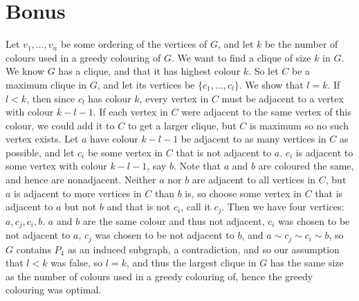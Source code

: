 \documentclass[11pt]{article}
\begin{document}
\section{Bonus} %
Let $v_1,\ldots,v_n$ be some ordering of the vertices of $G$, and let $k$ be
the number of colours used in a greedy colouring of $G$. We want to find a
clique of size $k$ in $G$. We know $G$ has a clique, and that it has highest
colour $k$. So let $C$ be a maximum clique in $G$, and let its vertices be
$\{c_1,\ldots,c_l\}$. We show that $l=k$. If $l<k$, then since $c_l$ has
colour $k$, every vertex in $C$ must be adjacent to a vertex with colour
$k-l-1$. If each vertex in $C$ were adjacent to the same vertex of this
colour, we could add it to $C$ to get a larger clique, but $C$ is maximum so
no such vertex exists. Let $a$ have colour $k-l-1$ be adjacent to as many
vertices in $C$ as possible, and let $c_i$ be some vertex in $C$ that is not
adjacent to $a$. $c_i$ is adjacent to some vertex with colour $k-l-1$, say
$b$. Note that $a$ and $b$ are coloured the same, and hence are nonadjacent.
Neither $a$ nor $b$ are adjacent to all vertices in $C$, but $a$ is adjacent
to more vertices in $C$ than $b$ is, so choose some vertex in $C$ that is
adjacent to $a$ but not $b$ and that is not $c_i$, call it $c_j$. Then we have
four vertices: $a,c_j,c_i,b$. $a$ and $b$ are the same colour and thus not
adjacent, $c_i$ was chosen to be not adjacent to $a$, $c_j$ was chosen to be
not adjacent to $b$, and $a\sim c_j\sim c_i\sim b$, so $G$ contains $P_4$ as
an induced subgraph, a contradiction, and so our assumption that $l<k$ was
false, so $l=k$, and thus the largest clique in $G$ has the same size as the
number of colours used in a greedy colouring of, hence the greedy colouring
was optimal.
\end{document}
